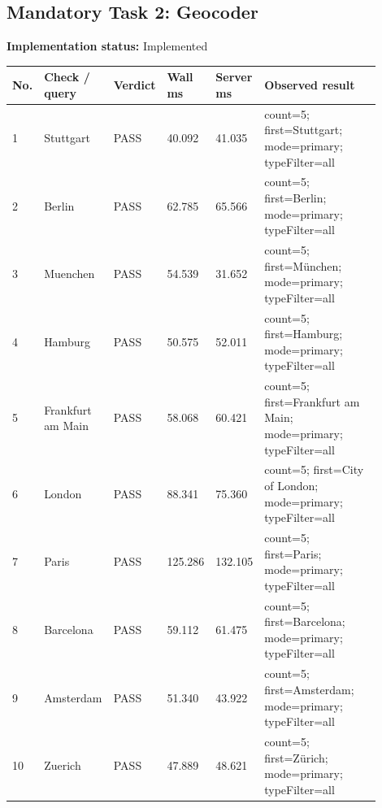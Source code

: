 \documentclass[10pt,a4paper]{article}
\begin{document}
\subsection{Mandatory Task 2: Geocoder}
\textbf{Implementation status:} Implemented\\
\scriptsize
\begin{longtable}{|P{0.045\linewidth}|P{0.19\linewidth}|P{0.105\linewidth}|P{0.085\linewidth}|P{0.085\linewidth}|P{0.385\linewidth}|}
\hline
\textbf{No.} & \textbf{Check / query} & \textbf{Verdict} & \textbf{Wall ms} & \textbf{Server ms} & \textbf{Observed result}\\ \hline
{} 1 & Stuttgart & PASS & 40.092 & 41.035 & count=5; first=Stuttgart; mode=primary; typeFilter=all\\ \hline
{} 2 & Berlin & PASS & 62.785 & 65.566 & count=5; first=Berlin; mode=primary; typeFilter=all\\ \hline
{} 3 & Muenchen & PASS & 54.539 & 31.652 & count=5; first=München; mode=primary; typeFilter=all\\ \hline
{} 4 & Hamburg & PASS & 50.575 & 52.011 & count=5; first=Hamburg; mode=primary; typeFilter=all\\ \hline
{} 5 & Frankfurt am Main & PASS & 58.068 & 60.421 & count=5; first=Frankfurt am Main; mode=primary; typeFilter=all\\ \hline
{} 6 & London & PASS & 88.341 & 75.360 & count=5; first=City of London; mode=primary; typeFilter=all\\ \hline
{} 7 & Paris & PASS & 125.286 & 132.105 & count=5; first=Paris; mode=primary; typeFilter=all\\ \hline
{} 8 & Barcelona & PASS & 59.112 & 61.475 & count=5; first=Barcelona; mode=primary; typeFilter=all\\ \hline
{} 9 & Amsterdam & PASS & 51.340 & 43.922 & count=5; first=Amsterdam; mode=primary; typeFilter=all\\ \hline
{} 10 & Zuerich & PASS & 47.889 & 48.621 & count=5; first=Zürich; mode=primary; typeFilter=all\\ \hline
\end{longtable}
\normalsize
\end{document}
